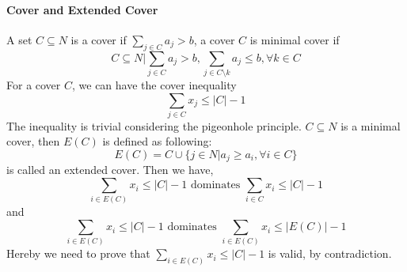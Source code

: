                 \paragraph{Cover and Extended Cover}
                    A set $C\subseteq N$ is a cover if $\sum_{j\in C} a_j > b$, a cover $C$ is minimal cover if
                    \begin{equation*}
                        C\subseteq N | \sum_{j\in C}a_j > b, \sum_{j\in C\setminus k} a_j \le b, \forall k \in C 
                    \end{equation*}
                    For a cover $C$, we can have the cover inequality
                    \begin{equation*}
                        \sum_{j\in C}x_j \le |C|-1
                    \end{equation*}
                    The inequality is trivial considering the pigeonhole principle. $C\subseteq N$ is a minimal cover, then $E(C)$ is defined as following:
                    \begin{equation*}
                        E(C) = C\cup \{j \in N | a_j \ge a_i, \forall i \in C\}
                    \end{equation*}
                    is called an extended cover. Then we have,
                    \begin{equation*}
                        \sum_{i\in E(C)} x_i \le |C| - 1 \text{ dominates } \sum_{i\in C} x_i \le |C| - 1
                    \end{equation*}
                    and
                    \begin{equation*}
                        \sum_{i\in E(C)} x_i \le |C| - 1 \text{ dominates } \sum_{i\in E(C)} x_i \le |E(C)| - 1
                    \end{equation*}
                    Hereby we need to prove that $\sum_{i\in E(C)} x_i \le |C| - 1$ is valid, by contradiction.\\
